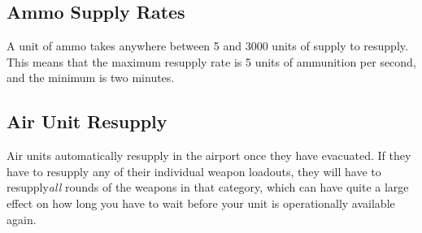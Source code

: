 \documentclass{article}
\begin{document}
\subsection{Ammo Supply Rates}

A unit of ammo takes anywhere between 5 and 3000 units of supply to resupply.
This means that the maximum resupply rate is 5 units of ammunition per second,
and the minimum is two minutes.

\subsection{Air Unit Resupply}

Air units automatically resupply in the airport once they have evacuated. If
they have to resupply any of their individual weapon loadouts, they will have to
resupply\emph{all} rounds of the weapons in that category, which can have quite
a large effect on how long you have to wait before your unit is operationally
available again.



%





\end{document}
